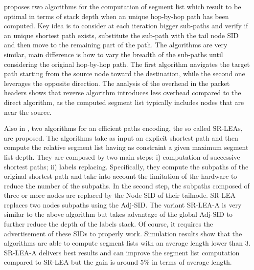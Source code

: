 \cite{pathencoding} proposes two algorithms for the computation of segment list which result to be optimal in terms of stack depth when an unique hop-by-hop path has been computed. Key idea is to consider at each iteration bigger sub-paths and verify if an unique shortest path exists, substitute the sub-path with the tail node SID and then move to the remaining part of the path. The algorithms are very similar, main difference is how to vary the breadth of the sub-paths until considering the original hop-by-hop path. The first algorithm navigates the target path starting from the source node toward the destination, while the second one leverages the opposite direction. The analysis of the overhead in the packet headers shows that reverse algorithm introduces less overhead compared to the direct algorithm, as the computed segment list typically includes nodes that are near the source. 

Also in \cite{labelencoding}, two algorithms for an efficient paths encoding, the so called SR-LEAs, are proposed. The algorithms take as input an explicit shortest path and then compute the relative segment list having as constraint a given maximum segment list depth. They are composed by two main steps: i) computation of successive shortest paths; ii) labels replacing. Specifically, they compute the subpaths of the original shortest path and take into account the limitation of the hardware to reduce the number of the subpaths. In the second step, the subpaths composed of three or more nodes are replaced by the Node-SID of their tailnode. SR-LEA replaces two nodes subpaths using the Adj-SID. The variant SR-LEA-A is very similar to the above algorithm but takes advantage of the global Adj-SID to further reduce the depth of the labels stack. Of course, it requires the advertisement of these SIDs to properly work. Simulation results show that the algorithms are able to compute segment lists with an average length lower than 3. SR-LEA-A delivers best results and can improve the segment list computation compared to SR-LEA but the gain is around 5\% in terms of average length.

